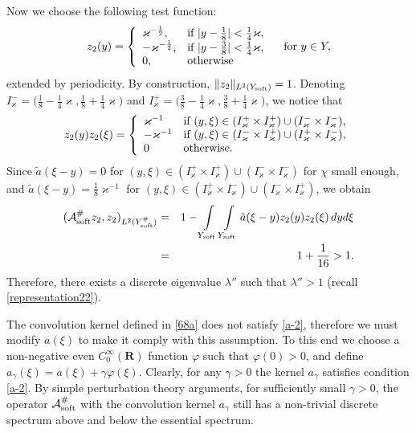 \documentclass[11pt]{article}
\newcommand\soft{{\rm soft}}
\def\AA{\mathcal{A}}
\theoremstyle{remark}
\begin{document}
Now we choose the following test function:
$$z_2(y)= \left\{\begin{array}{lll}
	\varkappa^{-\frac12}, & \hbox{if }|y-\frac18|<\frac14\varkappa,  \\
	-\varkappa^{-\frac12}, & \hbox{if }|y-\frac38|<\frac14\varkappa,  \\
	0, & \hbox{otherwise}
\end{array}
\right.
\quad \hbox{for }y\in Y,
$$
 extended by periodicity. By construction,  $\|z_2\|_{L^2(Y_\soft)} = 1$.
Denoting $I_\varkappa^-= \big(\frac18-\frac14 \varkappa,\frac18+\frac14 \varkappa\big)$ and
$I_\varkappa^+=\big(\frac38-\frac 14 \varkappa,\frac38+\frac14 \varkappa\big)$,
we notice that
$$
z_2(y) z_2(\xi)=\left\{
\begin{array}{ll}
	\varkappa^{-1}&\hbox{if }(y,\xi)\in (I_\varkappa^+\times  I_\varkappa^+)\cup ( I_\varkappa^-\times  I_\varkappa^-),\\
	-\varkappa^{-1}&\hbox{if }(y,\xi)\in (I_\varkappa^-\times  I_\varkappa^+)\cup ( I_\varkappa^+\times  I_\varkappa^-),\\
	0& \hbox{otherwise}.
\end{array}
\right.
$$
Since $\tilde{a}(\xi-y)=0$ for $(y,\xi)\in  (I_\varkappa^+\times  I_\varkappa^+)\cup ( I_\varkappa^-\times  I_\varkappa^-)$ for $\chi$ small enough,
and $\tilde{a}(\xi-y)=\frac18\varkappa^{-1}$ for $(y,\xi)\in ( I_\varkappa^+\times  I_\varkappa^-)\cup ( I_\varkappa^-\times  I_\varkappa^+)$,
we obtain
\begin{eqnarray*}
(\AA_\soft^\#  z_2,z_2)_{L^2 (Y^\#_\soft)}&=&1-\int\limits_{Y_\soft }\int\limits_{Y_\soft } \tilde{a}(\xi-y) z_2(y)z_2(\xi)\, dyd\xi \\
&=&
1+\frac{1}{16}>1.
\end{eqnarray*}
Therefore, there exists a discrete eigenvalue $\lambda''$ such that $\lambda''>1$ (recall \eqref{representation22}).

\bigskip
The convolution kernel defined in \eqref{68a} does not satisfy \eqref{a-2}, therefore we must
 modify $a(\xi)$ to make it comply with this assumption.
To this end we choose a non-negative even $C_0^\infty(\mathbf R)$ function $\varphi$ such that
$\varphi(0)>0$, and define $a_\gamma(\xi)=a(\xi)+\gamma\varphi(\xi)$.   Clearly, for any
$\gamma>0$ the kernel  $a_\gamma$ satisfies condition \eqref{a-2}.
By simple perturbation theory arguments, for sufficiently small $\gamma>0$,
the operator $\AA_\soft^\#$ with the convolution kernel $a_\gamma$ still has a non-trivial discrete spectrum above and below
the essential spectrum.
\end{document}

